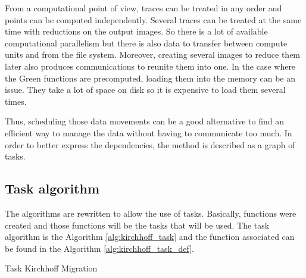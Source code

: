 From a computational point of view, traces can be treated in any order and points can be computed independently.
Several traces can be treated at the same time with reductions on the output images.
So there is a lot of available computational parallelism but there is also data to transfer between compute units and from the file system.
Moreover, creating several images to reduce them later also produces communications to reunite them into one.
In the case where the Green functions are precomputed, loading them into the memory can be an issue.
They take a lot of space on disk so it is expensive to load them several times.

Thus, scheduling those data movements can be a good alternative to find an efficient way to manage the data without having to communicate too much.
In order to better express the dependencies, the method is described as a graph of tasks.

\subsection{Task algorithm}

The algorithms are rewritten to allow the use of tasks.
Basically, functions were created and those functions will be the tasks that will be used.
The task algorithm is the Algorithm \ref{alg:kirchhoff_task} and the function associated can be found in the Algorithm \ref{alg:kirchhoff_task_def}.

\begin{algorithm}[h]
	\DontPrintSemicolon
	\SetAlgoVlined
	\caption{Task Kirchhoff Migration \label{alg:kirchhoff_task}}
\end{algorithm}

